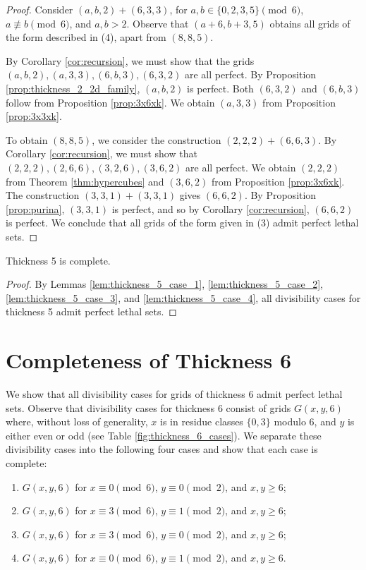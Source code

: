 \begin{proof}
Consider $(a,b,2) + (6,3,3)$, for $a,b \in \{0,2,3,5\} \pmod 6$, $a \not\equiv b \pmod 6$, and $a,b > 2$. Observe that $(a+6,b+3,5)$ obtains all grids of the form described in (4), apart from $(8,8,5)$.

By Corollary \ref{cor:recursion}, we must show that the grids $(a,b,2), (a,3,3), (6,b,3), (6,3,2)$ are all perfect. By Proposition \ref{prop:thickness_2_2d_family}, $(a,b,2)$ is perfect. Both $(6,3,2)$ and $(6,b,3)$ follow from Proposition \ref{prop:3x6xk}. We obtain $(a,3,3)$ from Proposition \ref{prop:3x3xk}.

To obtain $(8,8,5)$, we consider the construction $(2,2,2) + (6,6,3)$. By Corollary \ref{cor:recursion}, we must show that $(2,2,2), (2,6,6), (3,2,6), (3,6,2)$ are all perfect. We obtain $(2,2,2)$ from Theorem \ref{thm:hypercubes} and $(3,6,2)$ from Proposition \ref{prop:3x6xk}. The construction $(3,3,1)+(3,3,1)$ gives $(6,6,2)$. By Proposition \ref{prop:purina}, $(3,3,1)$ is perfect, and so by Corollary \ref{cor:recursion}, $(6,6,2)$ is perfect. We conclude that all grids of the form given in (3) admit perfect lethal sets.
\end{proof}

\begin{lem}
\label{lem:thickness_5_complete}
Thickness 5 is complete.
\end{lem}

\begin{proof}
By Lemmas \ref{lem:thickness_5_case_1}, \ref{lem:thickness_5_case_2}, \ref{lem:thickness_5_case_3}, and \ref{lem:thickness_5_case_4}, all divisibility cases for thickness 5 admit perfect lethal sets.
\end{proof}

\section{Completeness of Thickness 6}
We show that all divisibility cases for grids of thickness 6 admit perfect lethal sets. Observe that divisibility cases for thickness 6 consist of grids $G(x,y,6)$ where, without loss of generality, $x$ is in residue classes $\{0,3\}$ modulo 6, and $y$ is either even or odd (see Table \ref{fig:thickness_6_cases}). We separate these divisibility cases into the following four cases and show that each case is complete:

\begin{enumerate}
\item $G(x,y,6)$ for $x \equiv 0 \pmod 6$, $y \equiv 0 \pmod 2$, and $x,y \geq 6$;
\item $G(x,y,6)$ for $x \equiv 3 \pmod 6$, $y \equiv 1 \pmod 2$, and $x,y \geq 6$;
\item $G(x,y,6)$ for $x \equiv 3 \pmod 6$, $y \equiv 0 \pmod 2$, and $x,y \geq 6$;
\item $G(x,y,6)$ for $x \equiv 0 \pmod 6$, $y \equiv 1 \pmod 2$, and $x,y \geq 6$.
\end{enumerate}

